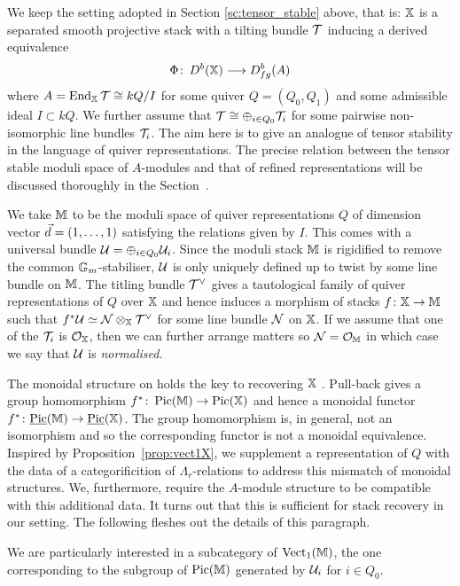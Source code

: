 \documentclass[12pt]{amsart}
\begin{document}
We keep the setting adopted in Section \ref{sc:tensor_stable} above, that is: $\mathbb{X}$ is a separated smooth projective stack with a tilting bundle $\mathcal{T}$ inducing a derived equivalence $$\Phi \colon \, D^b(\mathbb{X}) \longrightarrow D^b_{fg}(A)$$ where $A=\operatorname{End}_{\mathbb{X}} \mathcal{T} \cong kQ/I$ for some quiver $Q = (Q_0,Q_1)$ and some admissible ideal $I\subset kQ$. 
We further assume that $\mathcal{T} \cong \oplus_{i\in Q_0} \mathcal{T}_i$ for some pairwise non-isomorphic line bundles $\mathcal{T}_i$.
The aim here is to give an analogue of tensor stability in the language of quiver representations.
The precise relation between the tensor stable moduli space of $A$-modules and that of refined representations will be discussed thoroughly in the Section~\label{sc:Picard}.

We take $\mathbb{M}$ to be the moduli space of quiver representations $Q$ of dimension vector ${\vec{d}} = (1, \ldots, 1)$ satisfying the relations given by $I$. 
This comes with a universal bundle $\mathcal{U}  = \oplus_{i \in Q_0} \mathcal{U}_i$.
Since the moduli stack $\mathbb{M}$ is rigidified to remove the common $\mathbb{G}_m$-stabiliser, $\mathcal{U}$ is only uniquely defined up to twist by some line bundle on $\mathbb{M}$.
The titling bundle $\mathcal{T}^{\vee}$ gives a tautological family of quiver representations of $Q$ over $\mathbb{X}$ and hence induces a morphism of stacks $f \colon \mathbb{X} \rightarrow \mathbb{M}$ such that $f^* \mathcal{U} \simeq \mathcal{N} \otimes_{\mathbb{X}} \mathcal{T}^{\vee}$ for some line bundle $\mathcal{N}$ on $\mathbb{X}$.
If we assume that one of the $\mathcal{T}_i$ is $\mathcal{O}_{\mathbb{X}}$, then we can further arrange matters so $\mathcal{N} = \mathcal{O}_{\mathbb{M}}$ in which case we say that $\mathcal{U}$ is {\em normalised}.

The monoidal structure on holds the key to recovering $\mathbb{X}$ \cite{Lurie}.
Pull-back gives a group homomorphism $f^* \colon \operatorname{Pic}(\mathbb{M}) \rightarrow \operatorname{Pic}(\mathbb{X})$ and hence a monoidal functor $f^* \colon \underline{\operatorname{Pic}}(\mathbb{M}) \rightarrow \underline{\operatorname{Pic}}(\mathbb{X})$.
The group homomorphism is, in general, not an isomorphism and so the corresponding functor is not a monoidal equivalence.
Inspired by Proposition~\ref{prop:vect1X}, we supplement a representation of $Q$ with the data of a categorificition of $\Lambda_r$-relations to address this mismatch of monoidal structures.
We, furthermore, require the $A$-module structure to be compatible with this additional data.
It turns out that this is sufficient for stack recovery in our setting.
The following fleshes out the details of this paragraph.

We are particularly interested in a subcategory of $\text{Vect}_1(\mathbb{M})$, the one corresponding to the subgroup of $\operatorname{Pic}(\mathbb{M})$ generated by $\mathcal{U}_i$ for $i \in Q_0$.
\end{document}

